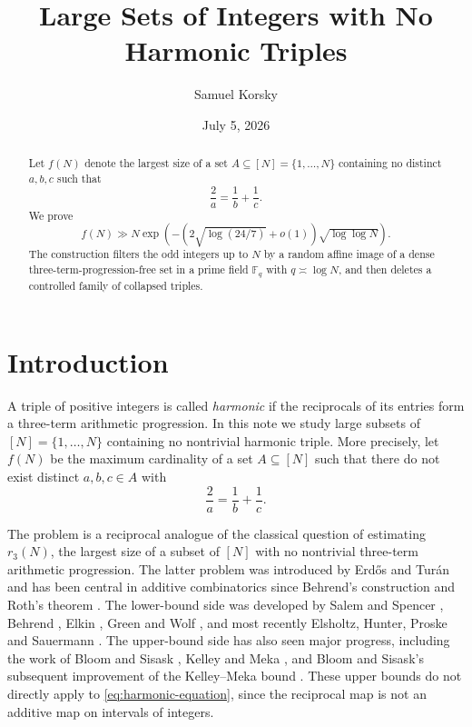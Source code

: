\documentclass[11pt]{article}
\title{Large Sets of Integers with No Harmonic Triples}
\author{Samuel Korsky}
\date{July 5, 2026}
\theoremstyle{plain}
\theoremstyle{remark}
\newcommand{\F}{\mathbb F}
\begin{document}
\maketitle

\begin{abstract}
\noindent
Let $f(N)$ denote the largest size of a set $A\subseteq [N]=\{1,\ldots,N\}$ containing no distinct $a,b,c$ such that
\[
  \frac2a=\frac1b+\frac1c .
\]
We prove
\[
  f(N)\gg N\exp\!\left(-(2\sqrt{\log(24/7)}+o(1))\sqrt{\log\log N}\right).
\]
The construction filters the odd integers up to $N$ by a random affine image of a dense three-term-progression-free set in a prime field $\F_q$ with $q\asymp\log N$, and then deletes a controlled family of collapsed triples.
\end{abstract}

\section{Introduction}

A triple of positive integers is called \emph{harmonic} if the reciprocals of its entries form a three-term arithmetic progression.  In this note we study large subsets of $[N]=\{1,\ldots,N\}$ containing no nontrivial harmonic triple.  More precisely, let $f(N)$ be the maximum cardinality of a set $A\subseteq [N]$ such that there do not exist distinct $a,b,c\in A$ with
\begin{equation}\label{eq:harmonic-equation}
  \frac2a=\frac1b+\frac1c .
\end{equation}

The problem is a reciprocal analogue of the classical question of estimating $r_3(N)$, the largest size of a subset of $[N]$ with no nontrivial three-term arithmetic progression.  The latter problem was introduced by Erd\H{o}s and Tur\'an \cite{ErdosTuran1936} and has been central in additive combinatorics since Behrend's construction \cite{Behrend1946} and Roth's theorem \cite{Roth1953}.  The lower-bound side was developed by Salem and Spencer \cite{SalemSpencer1942}, Behrend \cite{Behrend1946}, Elkin \cite{Elkin2011}, Green and Wolf \cite{GreenWolf2010}, and most recently Elsholtz, Hunter, Proske and Sauermann \cite{EHPS2024}.  The upper-bound side has also seen major progress, including the work of Bloom and Sisask \cite{BloomSisask2020}, Kelley and Meka \cite{KelleyMeka2023}, and Bloom and Sisask's subsequent improvement of the Kelley--Meka bound \cite{BloomSisask2023}.  These upper bounds do not directly apply to \eqref{eq:harmonic-equation}, since the reciprocal map is not an additive map on intervals of integers.
\end{document}
